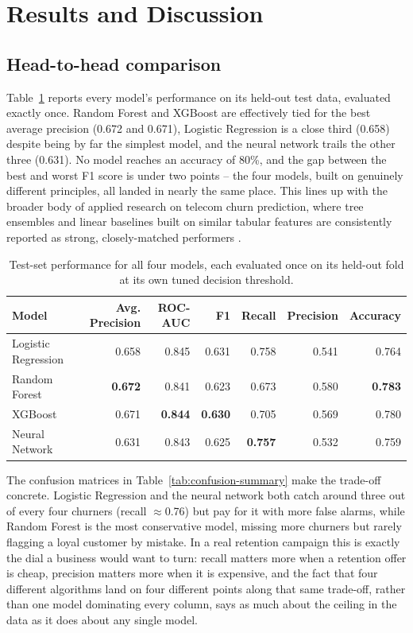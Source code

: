 \documentclass{article}
\begin{document}
\section{Results and Discussion}

\subsection{Head-to-head comparison}
Table~\ref{tab:model-comparison} reports every model's performance on its held-out test data, evaluated exactly once. Random Forest and XGBoost are effectively tied for the best average precision (0.672 and 0.671), Logistic Regression is a close third (0.658) despite being by far the simplest model, and the neural network trails the other three (0.631). No model reaches an accuracy of 80\%, and the gap between the best and worst F1 score is under two points -- the four models, built on genuinely different principles, all landed in nearly the same place. This lines up with the broader body of applied research on telecom churn prediction, where tree ensembles and linear baselines built on similar tabular features are consistently reported as strong, closely-matched performers \cite{ahmad2019}.

\begin{table}[H]
\centering
\small
\begin{tabular}{lrrrrrr}
\toprule
\textbf{Model} & \textbf{Avg. Precision} & \textbf{ROC-AUC} & \textbf{F1} & \textbf{Recall} & \textbf{Precision} & \textbf{Accuracy} \\
\midrule
Logistic Regression & 0.658 & 0.845 & 0.631 & 0.758 & 0.541 & 0.764 \\
Random Forest        & \textbf{0.672} & 0.841 & 0.623 & 0.673 & 0.580 & \textbf{0.783} \\
XGBoost              & 0.671 & \textbf{0.844} & \textbf{0.630} & 0.705 & 0.569 & 0.780 \\
Neural Network       & 0.631 & 0.843 & 0.625 & \textbf{0.757} & 0.532 & 0.759 \\
\bottomrule
\end{tabular}
\caption{\centering Test-set performance for all four models, each evaluated once on its held-out fold at its own tuned decision threshold.}
\label{tab:model-comparison}
\end{table}

The confusion matrices in Table~\ref{tab:confusion-summary} make the trade-off concrete. Logistic Regression and the neural network both catch around three out of every four churners (recall $\approx$0.76) but pay for it with more false alarms, while Random Forest is the most conservative model, missing more churners but rarely flagging a loyal customer by mistake. In a real retention campaign this is exactly the dial a business would want to turn: recall matters more when a retention offer is cheap, precision matters more when it is expensive, and the fact that four different algorithms land on four different points along that same trade-off, rather than one model dominating every column, says as much about the ceiling in the data as it does about any single model.
\end{document}
